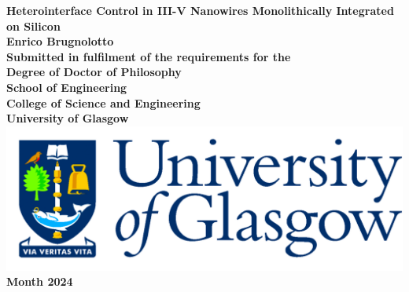 \documentclass[12pt,titlepage,oneside]{book} %
\begin{document}
\begin{titlepage}
\centering
\vspace*{3cm}  %
\bfseries\Large
Heterointerface Control in III-V Nanowires Monolithically Integrated on Silicon\\
\vspace{3cm}
\normalfont\large
Enrico Brugnolotto\\
\vspace{2cm}
Submitted in fulfilment of the requirements for the\\
Degree of Doctor of Philosophy\\
\vspace{2cm}
School of Engineering\\
College of Science and Engineering\\
University of Glasgow\\
\vspace{1cm}
\includegraphics[scale=0.125]{GlaLogo.pdf}
\\
\vspace{1cm}
Month 2024
\end{titlepage}
\frontmatter  %
% 
\tableofcontents
\listoftables
\listoffigures
\printglossaries
% 
% 

\mainmatter %

% 
% 
% 
% 
% 


\appendix
% 
% 

\backmatter  %

\printbibliography
\end{document}
